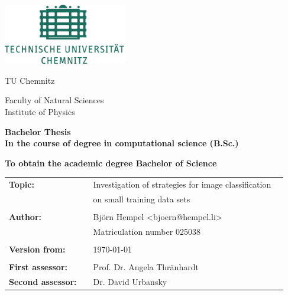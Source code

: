 \thispagestyle{empty}

\includegraphics[width=0.4\textwidth]{images/tu_chemnitz}\\[2\baselineskip]

\begin{center}
\Large{TU Chemnitz}
\end{center}


\begin{center}
\Large{Faculty of Natural Sciences}\\
\Large{Institute of Physics}\\[4\baselineskip]
\end{center}

\begin{center}
\textbf{\LARGE{Bachelor Thesis}}\\[2\baselineskip]
\textbf{{In the course of degree in computational science (B.Sc.)}}
\end{center}

\begin{center}
\textbf{{To obtain the academic degree Bachelor of Science}}
\end{center}

\vspace*{\fill}
\begin{flushleft}
\begin{tabular}{llll}
\textbf{Topic:} & & Investigation of strategies for image classification \\
& & on small training data sets & \\
& & \\
\textbf{Author:} & & Björn Hempel \textless{bjoern@hempel.li}\textgreater & \\
& & Matriculation number 025038 & \\
& & \\
\textbf{Version from:} & & \today &\\
& & \\
\textbf{First assessor:} & & Prof. Dr. Angela Thränhardt &\\
\textbf{Second assessor:} & & Dr. David Urbansky &\\
\end{tabular}
\end{flushleft}



